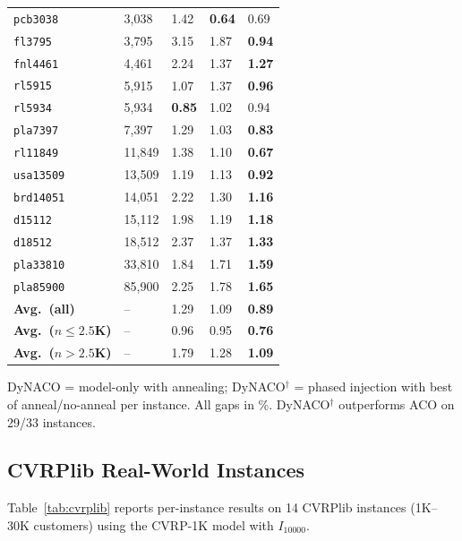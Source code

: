 \documentclass[sigconf]{acmart}
\begin{document}
\begin{table}[h]
\begin{tabularx}{\columnwidth}{lYYYY}
\midrule
\texttt{pcb3038}  & 3,038 & 1.42 & \textbf{0.64} & 0.69 \\
\texttt{fl3795}   & 3,795 & 3.15 & 1.87 & \textbf{0.94} \\
\texttt{fnl4461}  & 4,461 & 2.24 & 1.37 & \textbf{1.27} \\
\texttt{rl5915}   & 5,915 & 1.07 & 1.37 & \textbf{0.96} \\
\texttt{rl5934}   & 5,934 & \textbf{0.85} & 1.02 & 0.94 \\
\texttt{pla7397}  & 7,397 & 1.29 & 1.03 & \textbf{0.83} \\
\texttt{rl11849}  & 11,849 & 1.38 & 1.10 & \textbf{0.67} \\
\texttt{usa13509} & 13,509 & 1.19 & 1.13 & \textbf{0.92} \\
\texttt{brd14051} & 14,051 & 2.22 & 1.30 & \textbf{1.16} \\
\texttt{d15112}   & 15,112 & 1.98 & 1.19 & \textbf{1.18} \\
\texttt{d18512}   & 18,512 & 2.37 & 1.37 & \textbf{1.33} \\
\texttt{pla33810} & 33,810 & 1.84 & 1.71 & \textbf{1.59} \\
\texttt{pla85900} & 85,900 & 2.25 & 1.78 & \textbf{1.65} \\
\midrule
\textbf{Avg.~(all)} & -- & 1.29 & 1.09 & \textbf{0.89} \\
\textbf{Avg.~($n{\leq}2.5$K)} & -- & 0.96 & 0.95 & \textbf{0.76} \\
\textbf{Avg.~($n{>}2.5$K)} & -- & 1.79 & 1.28 & \textbf{1.09} \\
\bottomrule
\end{tabularx}
\vspace{2pt}

\raggedright\footnotesize{DyNACO = model-only with annealing; DyNACO$^{\dagger}$ = phased injection with best of anneal/no-anneal per instance. All gaps in \%. DyNACO$^{\dagger}$ outperforms ACO on 29/33 instances.}
\end{table}

\subsection{CVRPlib Real-World Instances}
\label{app:cvrplib}

Table~\ref{tab:cvrplib} reports per-instance results on 14 CVRPlib instances (1K--30K customers) using the CVRP-1K model with $I_{10000}$.
\end{document}
